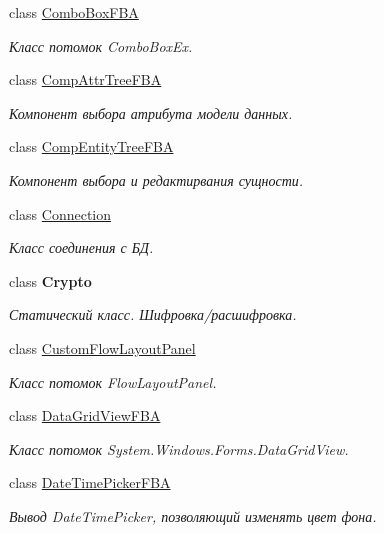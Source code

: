 \begin{DoxyCompactItemize}
class \mbox{\hyperlink{class_f_b_a_1_1_combo_box_f_b_a}{Combo\+Box\+F\+BA}}
\begin{DoxyCompactList}\small\item\em Класс потомок Combo\+Box\+Ex. \end{DoxyCompactList}\item 
class \mbox{\hyperlink{class_f_b_a_1_1_comp_attr_tree_f_b_a}{Comp\+Attr\+Tree\+F\+BA}}
\begin{DoxyCompactList}\small\item\em Компонент выбора атрибута модели данных. ~\newline
\end{DoxyCompactList}\item 
class \mbox{\hyperlink{class_f_b_a_1_1_comp_entity_tree_f_b_a}{Comp\+Entity\+Tree\+F\+BA}}
\begin{DoxyCompactList}\small\item\em Компонент выбора и редактирвания сущности. ~\newline
\end{DoxyCompactList}\item 
class \mbox{\hyperlink{class_f_b_a_1_1_connection}{Connection}}
\begin{DoxyCompactList}\small\item\em Класс соединения с БД. \end{DoxyCompactList}\item 
class {\bfseries Crypto}
\begin{DoxyCompactList}\small\item\em Статический класс. Шифровка/расшифровка. \end{DoxyCompactList}\item 
class \mbox{\hyperlink{class_f_b_a_1_1_custom_flow_layout_panel}{Custom\+Flow\+Layout\+Panel}}
\begin{DoxyCompactList}\small\item\em Класс потомок Flow\+Layout\+Panel. \end{DoxyCompactList}\item 
class \mbox{\hyperlink{class_f_b_a_1_1_data_grid_view_f_b_a}{Data\+Grid\+View\+F\+BA}}
\begin{DoxyCompactList}\small\item\em Класс потомок System.\+Windows.\+Forms.\+Data\+Grid\+View. \end{DoxyCompactList}\item 
class \mbox{\hyperlink{class_f_b_a_1_1_date_time_picker_f_b_a}{Date\+Time\+Picker\+F\+BA}}
\begin{DoxyCompactList}\small\item\em Вывод Date\+Time\+Picker, позволяющий изменять цвет фона. \end{DoxyCompactList}\item 

\end{DoxyCompactItemize}
